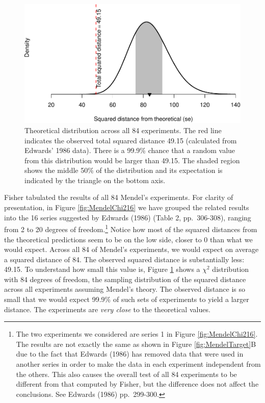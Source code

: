 \documentclass[english,floatsintext,man]{apa6}
\theoremstyle{definition}
\theoremstyle{definition}
\theoremstyle{definition}
\theoremstyle{remark}
\begin{document}
\begin{figure}
\centering
\includegraphics{paper_pdf_files/figure-latex/MendelChi2DF84-1.pdf}
\caption{\label{fig:MendelChi2DF84}Theoretical distribution across all 84
experiments. The red line indicates the observed total squared distance
49.15 (calculated from Edwards' 1986 data). There is a 99.9\% chance
that a random value from this distribution would be larger than 49.15.
The shaded region shows the middle 50\% of the distribution and its
expectation is indicated by the triangle on the bottom axis.}
\end{figure}

Fisher tabulated the results of all 84 Mendel's experiments. For clarity
of presentation, in Figure \ref{fig:MendelChi216} we have grouped the
related results into the 16 series suggested by Edwards (1986) (Table 2,
pp.~306-308), ranging from 2 to 20 degrees of freedom.\footnote{The two
  experiments we considered are series 1 in Figure
  \ref{fig:MendelChi216}. The results are not exactly the same as shown
  in Figure \ref{fig:MendelTarget}B due to the fact that Edwards (1986)
  has removed data that were used in another series in order to make the
  data in each experiment independent from the others. This also causes
  the overall test of all 84 experiments to be different from that
  computed by Fisher, but the difference does not affect the
  conclusions. See Edwards (1986) pp.~299-300.} Notice how most of the
squared distances from the theoretical predictions seem to be on the low
side, closer to 0 than what we would expect. Across all 84 of Mendel's
experiments, we would expect on average a squared distance of 84. The
observed squared distance is substantially less: 49.15. To understand
how small this value is, Figure \ref{fig:MendelChi2DF84} shows a
\(\chi^2\) distribution with 84 degrees of freedom, the sampling
distribution of the squared distance across all experiments assuming
Mendel's theory. The observed distance is so small that we would expect
99.9\% of such sets of experiments to yield a larger distance. The
experiments are \emph{very close} to the theoretical values.
\end{document}
